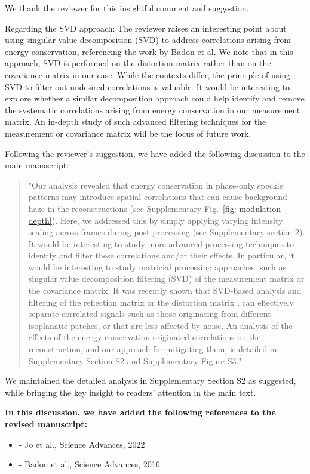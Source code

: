 \documentclass[12pt]{article}
\newenvironment{finished_ourresponse}
    {\begin{tcolorbox}[width=\linewidth,breakable,enhanced,colback=gray!5,colframe=finished_responsecolor!50,title=Response,left=5pt,right=5pt]}
    {\end{tcolorbox}}
\begin{document}
\begin{finished_ourresponse}
    
We thank the reviewer for this insightful comment and suggestion.

Regarding the SVD approach: The reviewer raises an interesting point about using singular value decomposition (SVD) to address correlations arising from energy conservation, referencing the work by Badon et al.\cite{badon2020distortion} We note that in this approach, SVD is performed on the distortion matrix rather than on the covariance matrix in our case. While the contexts differ, the principle of using SVD to filter out undesired correlations is valuable. It would be interesting to explore whether a similar decomposition approach could help identify and remove the systematic correlations arising from energy conservation in our measurement matrix. An in-depth study of such advanced filtering techniques for the measurement or covariance matrix will be the focus of future work.

Following the reviewer's suggestion, we have added the following discussion to the main manuscript: 
\begin{quote}
    "Our analysis revealed that energy conservation in phase-only speckle patterns may introduce spatial correlations that can cause background haze in the reconstructions (see Supplementary Fig.~\ref{fig: modulation depth}). Here, we addressed this by simply applying varying intensity scaling across frames during post-processing (see Supplementary section 2). It would be interesting to study more advanced processing techniques to identify and filter these correlations and/or their effects. In particular, it would be interesting to study matricial processing approaches, such as singular value decomposition filtering (SVD) of the measurement matrix or the covariance matrix. It was recently shown that SVD-based analysis and filtering of the reflection matrix or the distortion matrix \cite{jo2022through, badon2016smart, badon2020distortion},  can effectively separate correlated signals such as those originating from different isoplanatic patches, or that are less affected by noise. 
    An analysis of the effects of the energy-conservation originated correlations on the reconstruction, and our approach for mitigating them, is detailed in Supplementary Section S2 and Supplementary Figure S3."
\end{quote}
We maintained the detailed analysis in Supplementary Section S2 as suggested, while bringing the key insight to readers' attention in the main text.

\textbf{In this discussion, we have added the following references to the revised manuscript:}
\begin{itemize}[nosep]
\item \cite{jo2022through} - Jo et al., Science Advances, 2022
\item \cite{badon2016smart} - Badon et al., Science Advances, 2016
\end{itemize}

\end{finished_ourresponse}
\end{document}
